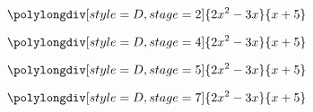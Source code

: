 \documentclass[border=2mm]{standalone}
\begin{document}
$$
    \polylongdiv[style=D, stage=2]{2x^2-3x}{x+5}
$$

$$
    \polylongdiv[style=D, stage=4]{2x^2-3x}{x+5}
$$

$$
    \polylongdiv[style=D, stage=5]{2x^2-3x}{x+5}
$$

$$
    \polylongdiv[style=D, stage=7]{2x^2-3x}{x+5}
$$
\end{document}
